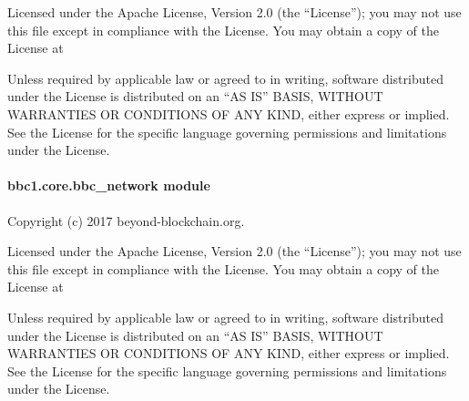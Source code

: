 \documentclass[letterpaper,10pt,english]{sphinxmanual}
\begin{document}
Licensed under the Apache License, Version 2.0 (the “License”);
you may not use this file except in compliance with the License.
You may obtain a copy of the License at
\begin{quote}

\end{quote}

Unless required by applicable law or agreed to in writing, software
distributed under the License is distributed on an “AS IS” BASIS,
WITHOUT WARRANTIES OR CONDITIONS OF ANY KIND, either express or implied.
See the License for the specific language governing permissions and
limitations under the License.


\paragraph{bbc1.core.bbc\_network module}
\label{\detokenize{bbc1.core.bbc_network:module-bbc1.core.bbc_network}}\label{\detokenize{bbc1.core.bbc_network:bbc1-core-bbc-network-module}}\label{\detokenize{bbc1.core.bbc_network::doc}}
Copyright (c) 2017 beyond-blockchain.org.

Licensed under the Apache License, Version 2.0 (the “License”);
you may not use this file except in compliance with the License.
You may obtain a copy of the License at
\begin{quote}

\end{quote}

Unless required by applicable law or agreed to in writing, software
distributed under the License is distributed on an “AS IS” BASIS,
WITHOUT WARRANTIES OR CONDITIONS OF ANY KIND, either express or implied.
See the License for the specific language governing permissions and
limitations under the License.
\end{document}
